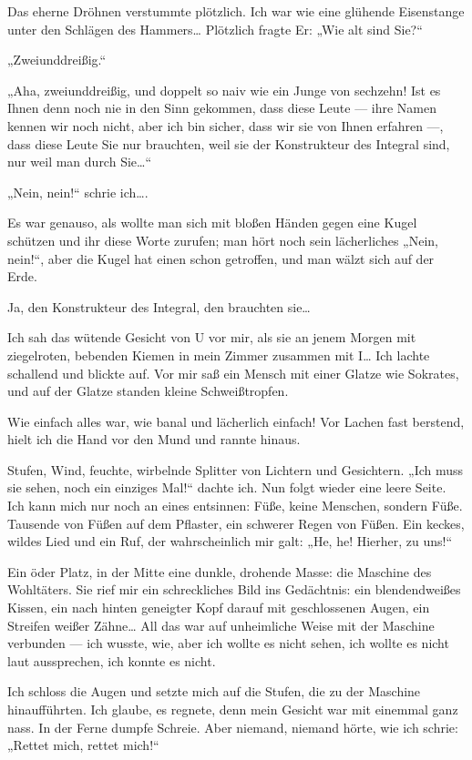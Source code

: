 Das eherne Dröhnen
verstummte plötzlich. Ich war wie eine glühende Eisenstange unter
den Schlägen des Hammers\ldots{} Plötzlich fragte Er: „Wie alt sind
Sie?“

„Zweiunddreißig.“

„Aha, zweiunddreißig, und doppelt so naiv wie ein Junge von
sechzehn! Ist es Ihnen denn noch nie in den Sinn gekommen, dass
diese Leute — ihre Namen kennen wir noch nicht, aber ich bin
sicher, dass wir sie von Ihnen erfahren —, dass diese Leute Sie nur
brauchten, weil sie der Konstrukteur des Integral sind, nur weil
man durch Sie\ldots{}“

„Nein, nein!“ schrie ich\ldots{}.

Es war genauso, als wollte man sich
mit bloßen Händen gegen eine Kugel schützen und ihr diese Worte
zurufen; man hört noch sein lächerliches „Nein, nein!“, aber die
Kugel hat einen schon getroffen, und man wälzt sich auf der Erde.

Ja, den Konstrukteur des Integral, den brauchten sie\ldots{}

Ich sah das
wütende Gesicht von U vor mir, als sie an jenem Morgen mit
ziegelroten, bebenden Kiemen in mein Zimmer zusammen mit I\ldots{} Ich
lachte schallend und blickte auf. Vor mir saß ein Mensch mit einer
Glatze wie Sokrates, und auf der Glatze standen kleine
Schweißtropfen.

Wie einfach alles war, wie banal und lächerlich einfach! Vor Lachen
fast berstend, hielt ich die Hand vor den Mund und rannte hinaus.

Stufen, Wind, feuchte, wirbelnde Splitter von Lichtern und
Gesichtern. „Ich muss sie sehen, noch ein einziges Mal!“ dachte
ich. Nun folgt wieder eine leere Seite. Ich kann mich nur noch an
eines entsinnen: Füße, keine Menschen, sondern Füße. Tausende von
Füßen auf dem Pflaster, ein schwerer Regen von Füßen. Ein keckes,
wildes Lied und ein Ruf, der wahrscheinlich mir galt: „He, he!
Hierher, zu uns!“

Ein öder Platz, in der Mitte eine dunkle, drohende Masse: die
Maschine des Wohltäters. Sie rief mir ein schreckliches Bild ins
Gedächtnis: ein blendendweißes Kissen, ein nach hinten geneigter
Kopf darauf mit geschlossenen Augen, ein Streifen weißer Zähne\ldots{}
All das war auf unheimliche Weise mit der Maschine verbunden — ich
wusste, wie, aber ich wollte es nicht sehen, ich wollte es nicht
laut aussprechen, ich konnte es nicht.

Ich schloss die Augen und
setzte mich auf die Stufen, die zu der Maschine hinaufführten. Ich
glaube, es regnete, denn mein Gesicht war mit einemmal ganz nass.
In der Ferne dumpfe Schreie. Aber niemand, niemand hörte, wie ich
schrie: „Rettet mich, rettet mich!“

